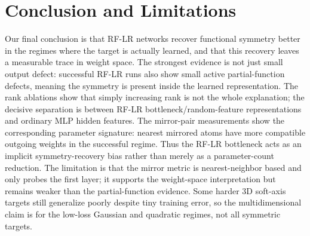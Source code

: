 \documentclass[nohyperref]{article}
\begin{document}
\section{Conclusion and Limitations}

Our final conclusion is that RF-LR networks recover functional symmetry better in the regimes where the target is actually learned, and that this recovery leaves a measurable trace in weight space.
The strongest evidence is not just small output defect: successful RF-LR runs also show small active partial-function defects, meaning the symmetry is present inside the learned representation.
The rank ablations show that simply increasing rank is not the whole explanation; the decisive separation is between RF-LR bottleneck/random-feature representations and ordinary MLP hidden features.
The mirror-pair measurements show the corresponding parameter signature: nearest mirrored atoms have more compatible outgoing weights in the successful regime.
Thus the RF-LR bottleneck acts as an implicit symmetry-recovery bias rather than merely as a parameter-count reduction.
The limitation is that the mirror metric is nearest-neighbor based and only probes the first layer; it supports the weight-space interpretation but remains weaker than the partial-function evidence.
Some harder 3D soft-axis targets still generalize poorly despite tiny training error, so the multidimensional claim is for the low-loss Gaussian and quadratic regimes, not all symmetric targets.



\end{document}
